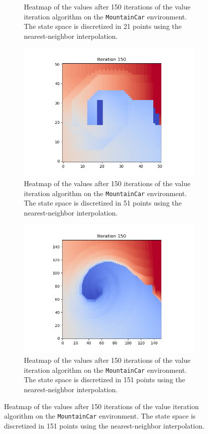 \documentclass{article}
\begin{document}
\begin{enumerate}[(a)]
\begin{figure}[h!]
\begin{subfigure}{0.3\textwidth}
\caption{Heatmap of the values after 150 iterations of the value iteration algorithm on the \texttt{MountainCar} environment. 
                The state space is discretized in 21 points using the nearest-neighbor interpolation.}
    \end{subfigure}
    \hspace{0.1 in}
    \begin{subfigure}{0.3\textwidth}
        \centering
        \includegraphics[width=\textwidth]{figures/part_2_moutain-car_s-51.png}
\caption{Heatmap of the values after 150 iterations of the value iteration algorithm on the \texttt{MountainCar} environment. 
                The state space is discretized in 51 points using the nearest-neighbor interpolation.}
    \end{subfigure}
        \hspace{0.1 in}
    \begin{subfigure}{0.3\textwidth}
        \centering
        \includegraphics[width=\textwidth]{figures/part_2_moutain-car_s-151.png}
\caption{Heatmap of the values after 150 iterations of the value iteration algorithm on the \texttt{MountainCar} environment. 
                The state space is discretized in 151 points using the nearest-neighbor interpolation.}
    \end{subfigure}
\end{figure}


\end{enumerate}
\end{document}
